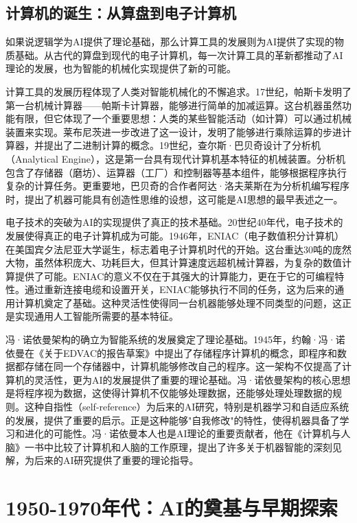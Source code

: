 \subsection{计算机的诞生：从算盘到电子计算机}

如果说逻辑学为AI提供了理论基础，那么计算工具的发展则为AI提供了实现的物质基础。从古代的算盘到现代的电子计算机，每一次计算工具的革新都推动了AI理论的发展，也为智能的机械化实现提供了新的可能。

计算工具的发展历程体现了人类对智能机械化的不懈追求。17世纪，帕斯卡发明了第一台机械计算器——帕斯卡计算器，能够进行简单的加减运算。这台机器虽然功能有限，但它体现了一个重要思想：人类的某些智能活动（如计算）可以通过机械装置来实现。莱布尼茨进一步改进了这一设计，发明了能够进行乘除运算的步进计算器，并提出了二进制计算的概念。19世纪，查尔斯·巴贝奇设计了分析机（Analytical Engine），这是第一台具有现代计算机基本特征的机械装置。分析机包含了存储器（磨坊）、运算器（工厂）和控制器等基本组件，能够根据程序执行复杂的计算任务。更重要地，巴贝奇的合作者阿达·洛夫莱斯在为分析机编写程序时，提出了机器可能具有创造性思维的设想，这可能是AI思想的最早表述之一。

电子技术的突破为AI的实现提供了真正的技术基础。20世纪40年代，电子技术的发展使得真正的电子计算机成为可能。1946年，ENIAC（电子数值积分计算机）在美国宾夕法尼亚大学诞生，标志着电子计算机时代的开始。这台重达30吨的庞然大物，虽然体积庞大、功耗巨大，但其计算速度远超机械计算器，为复杂的数值计算提供了可能。ENIAC的意义不仅在于其强大的计算能力，更在于它的可编程特性。通过重新连接电缆和设置开关，ENIAC能够执行不同的任务，这为后来的通用计算机奠定了基础。这种灵活性使得同一台机器能够处理不同类型的问题，这正是实现通用人工智能所需要的基本特征。

冯·诺依曼架构的确立为智能系统的发展奠定了理论基础。1945年，约翰·冯·诺依曼在《关于EDVAC的报告草案》中提出了存储程序计算机的概念，即程序和数据都存储在同一个存储器中，计算机能够修改自己的程序。这一架构不仅提高了计算机的灵活性，更为AI的发展提供了重要的理论基础。冯·诺依曼架构的核心思想是将程序视为数据，这使得计算机不仅能够处理数据，还能够处理处理数据的规则。这种自指性（self-reference）为后来的AI研究，特别是机器学习和自适应系统的发展，提供了重要的启示。正是这种能够"自我修改"的特性，使得机器具备了学习和进化的可能性。冯·诺依曼本人也是AI理论的重要贡献者，他在《计算机与人脑》一书中比较了计算机和人脑的工作原理，提出了许多关于机器智能的深刻见解，为后来的AI研究提供了重要的理论指导。

\section{1950-1970年代：AI的奠基与早期探索}

